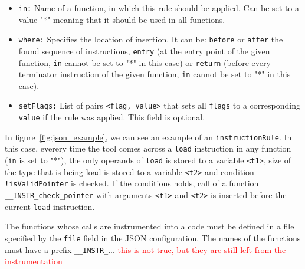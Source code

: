 \begin{itemize}
\begin{itemize}
    \item \texttt{in:} Name of a function, in which this rule should be
      applied. Can be set to a value "*" meaning that it should be used in all functions.
    \item \texttt{where:} Specifies the location of insertion. It can be:
      \texttt{before} or \texttt{after} the found sequence of instructions,
      \texttt{entry} (at the entry point of the given function, \texttt{in}
      cannot be set to "*" in this case) or \texttt{return} (before every
      terminator instruction of the given function, \texttt{in} cannot be set to
      "*" in this case).
    \item \texttt{setFlags:} List of pairs \texttt{<flag, value>} that sets
      all \texttt{flags} to a corresponding \texttt{value} if the rule was
      applied. This field is optional.
  \end{itemize}
\end{itemize}

In figure~\ref{fig:json_example}, we can see an example of an
\texttt{instructionRule}. In this case, everery time the tool comes across a
\texttt{load} instruction in any function (\texttt{in} is set to "*"), the only
operands of \texttt{load} is stored to a variable \texttt{<t1>}, size of the
type that is being load is stored to a variable \texttt{<t2>} and condition
\texttt{!isValidPointer} is checked. If the conditions holds, call of a
function \texttt{\_\_INSTR\_check\_pointer} with arguments \texttt{<t1>} and
\texttt{<t2>} is inserted before the current \texttt{load} instruction.

The functions whose calls are instrumented into a code must be defined in a
file specified by the \texttt{file} field in the JSON configuration. The names
of the functions must have a prefix \texttt{\_\_INSTR\_}...
\textcolor{red}{this is not true, but they are still left from the
instrumentation}

